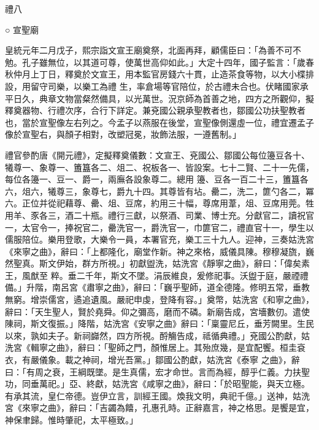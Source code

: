 
\begin{pinyinscope}

 禮八



 ○
 宣聖廟



 皇統元年二月戊子，熙宗詣文宣王廟奠祭，北面再拜，顧儒臣曰：「為善不可不勉。孔子雖無位，以其道可尊，使萬世高仰如此。」大定十四年，國子監言：「歲春秋仲月上丁日，釋奠於文宣王，用本監官房錢六十貫，止造茶食等物，以大小楪排設，用留守司樂，以樂工為禮
 生，率倉場等官陪位，於古禮未合也。伏睹國家承平日久，典章文物當粲然備具，以光萬世。況京師為首善之地，四方之所觀仰，擬釋奠器物、行禮次序，合行下詳定。兼兗國公親承聖教者也，鄒國公功扶聖教者也，當於宣聖像左右列之。今孟子以燕服在後堂，宣聖像側還虛一位，禮宜遷孟子像於宣聖右，與顏子相對，改塑冠冕，妝飾法服，一遵舊制。」



 禮官參酌唐《開元禮》，定擬釋奠儀數：文宣王、兗國公、鄒國公每位籩豆各十、犧尊一、象尊一、簠簋各二、俎二、祝板各一、皆設案。七十二賢、二十一先儒，每位各籩一、豆一、爵一，兩廡各設象尊二。總用
 籩、豆各一百二十三，簠簋各六，俎六，犧尊三，象尊七，爵九十四。其尊皆有坫。罍二，洗二，篚勺各二，冪六。正位并從祀藉尊、罍、俎、豆席，約用三十幅，尊席用葦，俎、豆席用莞。牲用羊、豕各三，酒二十瓶。禮行三獻，以祭酒、司業、博士充。分獻官二，讀祝官一，太官令一，捧祝官二，罍洗官一，爵洗官一，巾篚官二，禮直官十一，學生以儒服陪位。樂用登歌，大樂令一員，本署官充，樂工三十九人。迎神，三奏姑洗宮《來寧之曲》，辭曰：「上都隆化，廟堂作新。神之來格，威儀具陳。穆穆凝旒，巍然聖真。斯文伊始，群方所視。」初獻盥洗，姑洗宮《靜寧之曲》，辭曰：「偉矣素王，風猷至
 粹。垂二千年，斯文不墜。涓辰維良，爰修祀事。沃盥于庭，嚴禋禮備。」升階，南呂宮《肅寧之曲》，辭曰：「巍乎聖師，道全德隆。修明五常，垂教無窮。增崇儒宮，遹追遺風。嚴祀申虔，登降有容。」奠幣，姑洗宮《和寧之曲》，辭曰：「天生聖人，賢於堯舜。仰之彌高，磨而不磷。新廟告成，宮墻數仞。遣使陳祠，斯文復振。」降階，姑洗宮《安寧之曲》辭曰：「稟靈尼丘，垂芳闕里。生民以來，孰如夫子。新祠巋然，四方所視。酹觴告成，祗循典禮。」兗國公酌獻，姑洗宮《輯寧之曲》，辭曰：「聖師之門，顏惟居上。其殆庶幾，是宜配饗。桓圭袞衣，有嚴儀象。載之神祠，增光吾黨。」鄒國公酌獻，姑洗宮《泰寧
 之曲》，辭曰：「有周之衰，王綱既墜。是生真儒，宏才命世。言而為經，醇乎仁義。力扶聖功，同垂萬祀。」亞、終獻，姑洗宮《咸寧之曲》，辭曰：「於昭聖能，與天立極。有承其流，皇仁帝德。豈伊立言，訓經王國。煥我文明，典祀千億。」送神，姑洗宮《來寧之曲》，辭曰：「吉蠲為饎，孔惠孔時。正辭嘉言，神之格思。是饗是宜，神保聿歸。惟時肇祀，太平極致。」




\end{pinyinscope}
